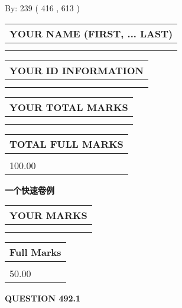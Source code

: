 \documentclass{ctexart}
\begin{document}
   
\hspace{1.0in} By: 
 239 ( 416 ,  613 )
   
   
   
   
\newpage 
\setcounter{page}{ 
   492001 } 
   
   
   
   
\noindent\begin{tabular}{|l|}
\hline
YOUR NAME (FIRST, ... LAST)  \\
\hline
 \\ 
 \\ 
\hline
\end{tabular}
\hspace{0.05in} \begin{tabular}{|l|}
\hline
 YOUR   ID   INFORMATION  \\
\hline
 \\ 
 \\ 
\hline
\end{tabular}
   
   
\vspace{0.2in}\noindent\begin{tabular}{|l|}
\hline
YOUR TOTAL MARKS  \\
\hline
 \\ 
 \\ 
\hline
\end{tabular}
\hspace{0.05in} \begin{tabular}{|l|}
\hline
TOTAL FULL MARKS  \\
\hline
 \\ 
100.00 \\
\hline
\end{tabular}
   
   
 \vspace{0.2in}
{\LARGE {\textbf{ 一个快速卷例}}}
   
   
  
\vspace{0.2in}
  
\noindent\begin{tabular}{|l|}
\hline
 YOUR MARKS  \\
\hline
 \\ 
 \\ 
\hline
\end{tabular}
\hspace{0.05in} \begin{tabular}{|l|}
\hline
 Full Marks  \\
\hline
 \\ 
50.00 \\
\hline
\end{tabular}
{\textbf{\Large{QUESTION
492.1 
}}}
  
\end{document}
